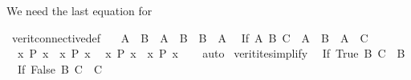 \begin{isabellebody}
\begin{isamarkuptext}
We need the last equation for %
\end{isamarkuptext}\isamarkuptrue%
\isamarkupfalse%
\ verit{\isacharunderscore}{\kern0pt}connective{\isacharunderscore}{\kern0pt}def{\isacharcolon}{\kern0pt}\ %
\isanewline
\ \ {\isacartoucheopen}{\isacharparenleft}{\kern0pt}A\ {\isacharequal}{\kern0pt}\ B{\isacharparenright}{\kern0pt}\ {\isasymlongleftrightarrow}\ {\isacharparenleft}{\kern0pt}{\isacharparenleft}{\kern0pt}A\ {\isasymlongrightarrow}\ B{\isacharparenright}{\kern0pt}\ {\isasymand}\ {\isacharparenleft}{\kern0pt}B\ {\isasymlongrightarrow}\ A{\isacharparenright}{\kern0pt}{\isacharparenright}{\kern0pt}{\isacartoucheclose}\isanewline
\ \ {\isacartoucheopen}{\isacharparenleft}{\kern0pt}If\ A\ B\ C{\isacharparenright}{\kern0pt}\ {\isacharequal}{\kern0pt}\ {\isacharparenleft}{\kern0pt}{\isacharparenleft}{\kern0pt}A\ {\isasymlongrightarrow}\ B{\isacharparenright}{\kern0pt}\ {\isasymand}\ {\isacharparenleft}{\kern0pt}{\isasymnot}A\ {\isasymlongrightarrow}\ C{\isacharparenright}{\kern0pt}{\isacharparenright}{\kern0pt}{\isacartoucheclose}\isanewline
\ \ {\isacartoucheopen}{\isacharparenleft}{\kern0pt}{\isasymexists}x{\isachardot}{\kern0pt}\ P\ x{\isacharparenright}{\kern0pt}\ {\isasymlongleftrightarrow}\ {\isasymnot}{\isacharparenleft}{\kern0pt}{\isasymforall}x{\isachardot}{\kern0pt}\ {\isasymnot}P\ x{\isacharparenright}{\kern0pt}{\isacartoucheclose}\isanewline
\ \ {\isacartoucheopen}{\isasymnot}{\isacharparenleft}{\kern0pt}{\isasymexists}x{\isachardot}{\kern0pt}\ P\ x{\isacharparenright}{\kern0pt}\ {\isasymlongleftrightarrow}\ {\isacharparenleft}{\kern0pt}{\isasymforall}x{\isachardot}{\kern0pt}\ {\isasymnot}P\ x{\isacharparenright}{\kern0pt}{\isacartoucheclose}\isanewline
%
\isadelimproof
\ \ %
\endisadelimproof
%
\isatagproof
{}\isamarkupfalse%
\ auto%
\endisatagproof
{\isafoldproof}%
%
\isadelimproof
\isanewline
%
\endisadelimproof
\isanewline
{}\isamarkupfalse%
\ verit{\isacharunderscore}{\kern0pt}ite{\isacharunderscore}{\kern0pt}simplify{\isacharcolon}{\kern0pt}\isanewline
\ \ {\isacartoucheopen}{\isacharparenleft}{\kern0pt}If\ True\ B\ C{\isacharparenright}{\kern0pt}\ {\isacharequal}{\kern0pt}\ B{\isacartoucheclose}\isanewline
\ \ {\isacartoucheopen}{\isacharparenleft}{\kern0pt}If\ False\ B\ C{\isacharparenright}{\kern0pt}\ {\isacharequal}{\kern0pt}\ C{\isacartoucheclose}\isanewline

\end{isabellebody}
